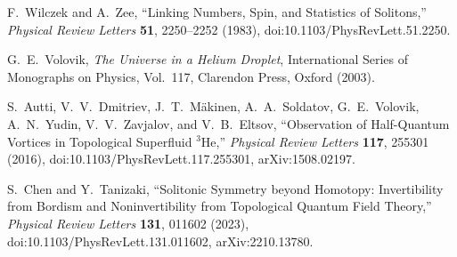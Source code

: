             F.~Wilczek and A.~Zee,
            \newblock ``Linking Numbers, Spin, and Statistics of Solitons,''
            \newblock \textit{Physical Review Letters} \textbf{51}, 2250--2252 (1983),
            \newblock doi:10.1103/PhysRevLett.51.2250.

            G.~E.~Volovik,
            \newblock \textit{The Universe in a Helium Droplet},
            \newblock International Series of Monographs on Physics, Vol.~117,
            \newblock Clarendon Press, Oxford (2003).

            S.~Autti, V.~V.~Dmitriev, J.~T.~M\"akinen, A.~A.~Soldatov,
            G.~E.~Volovik, A.~N.~Yudin, V.~V.~Zavjalov, and V.~B.~Eltsov,
            \newblock ``Observation of Half-Quantum Vortices in Topological Superfluid $^3$He,''
            \newblock \textit{Physical Review Letters} \textbf{117}, 255301 (2016),
            \newblock doi:10.1103/PhysRevLett.117.255301,
            \newblock arXiv:1508.02197.

            S.~Chen and Y.~Tanizaki,
            \newblock ``Solitonic Symmetry beyond Homotopy:
            Invertibility from Bordism and Noninvertibility from Topological Quantum Field Theory,''
            \newblock \textit{Physical Review Letters} \textbf{131}, 011602 (2023),
            \newblock doi:10.1103/PhysRevLett.131.011602,
            \newblock arXiv:2210.13780.

